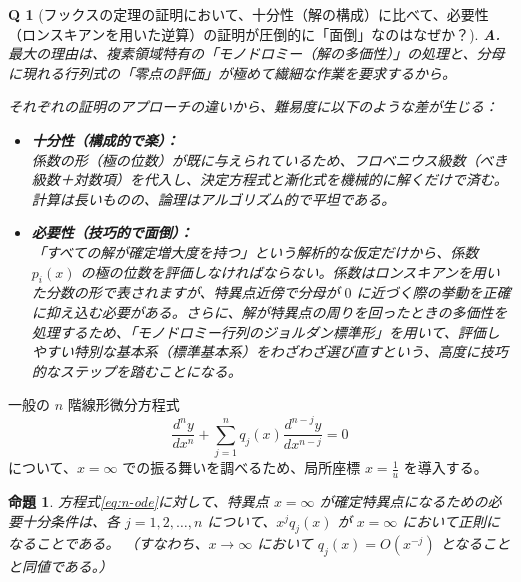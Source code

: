 \documentclass[paper=a4, fontsize=11pt]{jlreq} %
\theoremstyle{break}
\newtheorem{proposition}[theorem]{命題}
\theoremstyle{qa}
\newtheorem*{Q}{Q}
\theoremstyle{remark} %
\begin{document}
\begin{Q}[フックスの定理の証明において、十分性（解の構成）に比べて、必要性（ロンスキアンを用いた逆算）の証明が圧倒的に「面倒」なのはなぜか？]
\textbf{A.} 最大の理由は、複素領域特有の「モノドロミー（解の多価性）」の処理と、分母に現れる行列式の「零点の評価」が極めて繊細な作業を要求するから。

それぞれの証明のアプローチの違いから、難易度に以下のような差が生じる：
\begin{itemize}
    \item \textbf{十分性（構成的で楽）：}\\
    係数の形（極の位数）が既に与えられているため、フロベニウス級数（べき級数＋対数項）を代入し、決定方程式と漸化式を機械的に解くだけで済む。計算は長いものの、論理はアルゴリズム的で平坦である。
    
    \item \textbf{必要性（技巧的で面倒）：}\\
    「すべての解が確定増大度を持つ」という解析的な仮定だけから、係数 $p_i(x)$ の極の位数を評価しなければならない。係数はロンスキアンを用いた分数の形で表されますが、特異点近傍で分母が $0$ に近づく際の挙動を正確に抑え込む必要がある。さらに、解が特異点の周りを回ったときの多価性を処理するため、「モノドロミー行列のジョルダン標準形」を用いて、評価しやすい特別な基本系（標準基本系）をわざわざ選び直すという、高度に技巧的なステップを踏むことになる。
\end{itemize}
\end{Q}

一般の $n$ 階線形微分方程式
\begin{equation}\label{eq:n-ode}
\frac{d^{n}y}{dx^{n}} + \sum_{j=1}^{n} q_{j}(x)\frac{d^{n-j}y}{dx^{n-j}} = 0
\end{equation}
について、$x=\infty$ での振る舞いを調べるため、局所座標 $x = \frac{1}{u}$ を導入する。

\begin{proposition}\label{prop:regular_infinity_n}
方程式\eqref{eq:n-ode}に対して、特異点 $x=\infty$ が確定特異点になるための必要十分条件は、各 $j = 1, 2, \dots, n$ について、$x^{j}q_{j}(x)$ が $x=\infty$ において正則になることである。
（すなわち、$x \to \infty$ において $q_{j}(x) = O(x^{-j})$ となることと同値である。）
\end{proposition}
\end{document}
